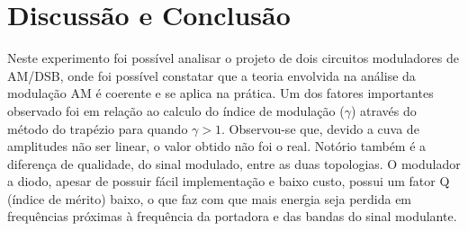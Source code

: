 \newpage
\section{Discussão e Conclusão}
Neste experimento foi possível analisar o projeto de dois circuitos moduladores de AM/DSB, onde foi possível constatar que a teoria envolvida na análise da modulação AM é coerente e se aplica na prática.
Um dos fatores importantes observado foi em relação ao calculo do índice de modulação ($\gamma$) através do método do trapézio para quando $\gamma > 1$. Observou-se que, devido a cuva de amplitudes não ser linear, o valor obtido não foi o real.
Notório também é a diferença de qualidade, do sinal modulado, entre as duas topologias. O modulador a diodo, apesar de possuir fácil implementação e baixo custo, possui um fator Q (índice de mérito) baixo, o que faz com que mais energia seja perdida em frequências próximas à frequência da portadora e das bandas do sinal modulante.